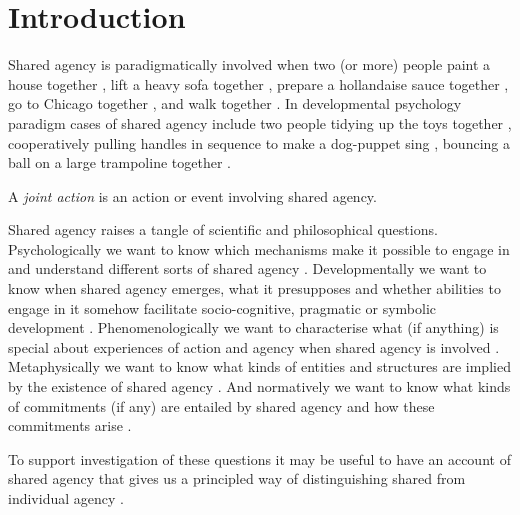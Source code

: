 \documentclass[12pt,\papersize]{extarticle}
\begin{document}
\section{Introduction}
Shared agency is paradigmatically involved when two (or more) people 
	paint a house together \citep{Bratman:1992mi}, 
	lift a heavy sofa together \citep{Velleman:1997oo}, 
	prepare a hollandaise sauce together \citep{Searle:1990em}, 
	go to Chicago together \citep{Kutz:2000si}, 
	and walk together \citep{gilbert_walking_1990}.
In developmental psychology paradigm cases of shared agency include  two people 
	tidying up the toys together \citep{Behne:2005qh},
	cooperatively pulling handles in sequence to make a dog-puppet sing \citep{Brownell:2006gu},
	bouncing a ball on a large trampoline together \citep{Tomasello:2007gl}.

A \emph{joint action} is an action or event involving shared agency.

Shared agency raises a tangle of scientific and philosophical questions.  Psychologically we want to know which mechanisms make it possible to engage in and understand different sorts of shared agency
\citep{vesper_minimal_2010}.  
Developmentally we want to know when shared agency emerges, what it presupposes and whether abilities to engage in it somehow facilitate socio-cognitive, pragmatic or symbolic development \citep{Moll:2007gu,Hughes:2004zj,Brownell:2006gu}.  
Phenomenologically we want to characterise what (if anything) is special about experiences of action and agency when shared agency is involved \citep{Pacherie:2010fk}.  
Metaphysically we want to know what kinds of entities and structures are implied by the existence of shared agency \citep{Gilbert:1992rs,Searle:1994lb}.  
And normatively we want to know what kinds of commitments (if any) are entailed by shared agency and how these commitments arise \citep{Roth:2004ki}.

To support investigation of these questions it may be useful to have an account of shared agency that gives us a principled way of distinguishing shared from individual agency \citep[compare][]{Bratman:2009lv}.  
\end{document}
